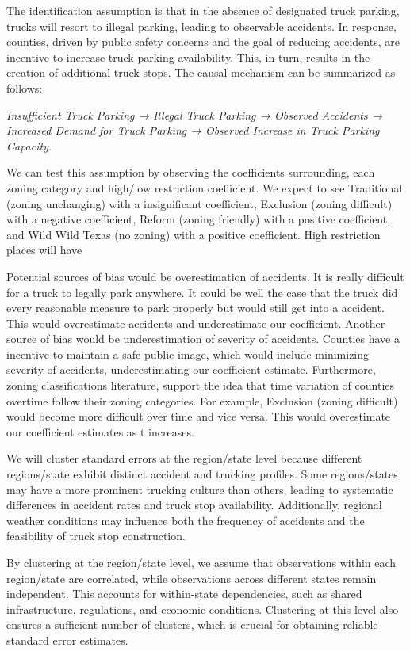 \documentclass[
  12pt]{article}
\begin{document}
The identification assumption is that in the absence of designated truck
parking, trucks will resort to illegal parking, leading to observable
accidents. In response, counties, driven by public safety concerns and
the goal of reducing accidents, are incentive to increase truck parking
availability. This, in turn, results in the creation of additional truck
stops. The causal mechanism can be summarized as follows:

\emph{Insufficient Truck Parking → Illegal Truck Parking → Observed
Accidents → Increased Demand for Truck Parking → Observed Increase in
Truck Parking Capacity.}

We can test this assumption by observing the coefficients surrounding,
each zoning category and high/low restriction coefficient. We expect to
see Traditional (zoning unchanging) with a insignificant coefficient,
Exclusion (zoning difficult) with a negative coefficient, Reform (zoning
friendly) with a positive coefficient, and Wild Wild Texas (no zoning)
with a positive coefficient. High restriction places will have

Potential sources of bias would be overestimation of accidents. It is
really difficult for a truck to legally park anywhere. It could be well
the case that the truck did every reasonable measure to park properly
but would still get into a accident. This would overestimate accidents
and underestimate our coefficient. Another source of bias would be
underestimation of severity of accidents. Counties have a incentive to
maintain a safe public image, which would include minimizing severity of
accidents, underestimating our coefficient estimate. Furthermore, zoning
classifications literature, support the idea that time variation of
counties overtime follow their zoning categories. For example, Exclusion
(zoning difficult) would become more difficult over time and vice
versa\citep{mclaughlinLandUseRegulation2012}. This would overestimate
our coefficient estimates as t increases.

We will cluster standard errors at the region/state level because
different regions/state exhibit distinct accident and trucking profiles.
Some regions/states may have a more prominent trucking culture than
others, leading to systematic differences in accident rates and truck
stop availability. Additionally, regional weather conditions may
influence both the frequency of accidents and the feasibility of truck
stop construction.

By clustering at the region/state level, we assume that observations
within each region/state are correlated, while observations across
different states remain independent. This accounts for within-state
dependencies, such as shared infrastructure, regulations, and economic
conditions. Clustering at this level also ensures a sufficient number of
clusters, which is crucial for obtaining reliable standard error
estimates.
\end{document}
